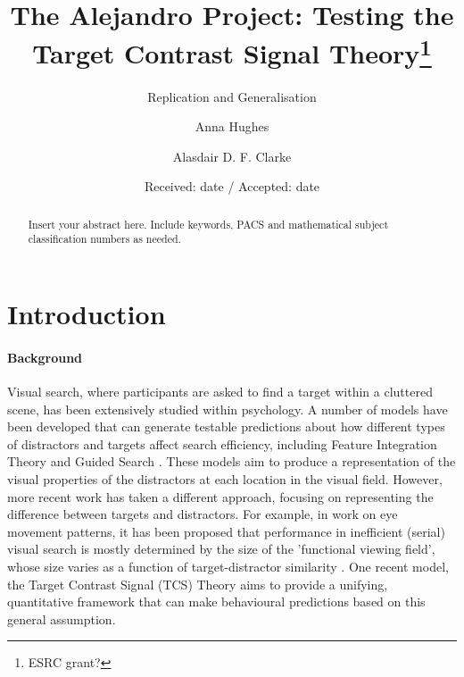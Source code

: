 \documentclass[smallextended]{svjour3}       %
\begin{document}
\title{The Alejandro Project: Testing the Target Contrast Signal Theory\thanks{ESRC grant?}
}
\subtitle{Replication and Generalisation}


\author{Anna Hughes \and Alasdair D. F. Clarke}



\date{Received: date / Accepted: date}

\maketitle

\begin{abstract}
Insert your abstract here. Include keywords, PACS and mathematical
subject classification numbers as needed.
\end{abstract}

\section{Introduction}
\label{intro}

\paragraph{Background}
Visual search, where participants are asked to find a target within a cluttered scene, has been extensively studied within psychology. A number of models have been developed that can generate testable predictions about how different types of distractors and targets affect search efficiency, including Feature Integration Theory \cite{treisman1980feature} and Guided Search \cite{wolfe1989guided,wolfe2014approaches}. These models aim to produce a representation of the visual properties of the distractors at each location in the visual field. However, more recent work has taken a different approach, focusing on representing the difference between targets and distractors. For example, in work on eye movement patterns, it has been proposed that performance in inefficient (serial) visual search is mostly determined by the size of the 'functional viewing field', whose size varies as a function of target-distractor similarity \cite{hulleman2017brink}. One recent model, the Target Contrast Signal (TCS) Theory \cite{lleras2020target} aims to provide a unifying, quantitative framework that can make behavioural predictions based on this general assumption.
\end{document}
